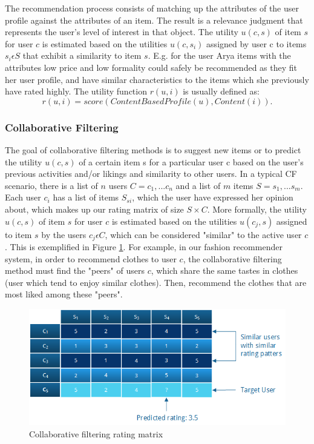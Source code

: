 The recommendation process consists of matching up the attributes of the user profile against the attributes of an item. The result is a relevance judgment that represents the user's level of interest in that object. The utility $u(c, s)$ of item $s$ for user $c$ is estimated based on the utilities $u(c, s_{i})$ assigned by user c to items $s_{i} \epsilon S$ that exhibit a similarity to item $s$. E.g. for the user Arya items with the attributes low price and low formality could safely be recommended as they fit her user profile, and have similar characteristics to the items which she previously have rated highly. The utility function $r(u, i)$ is usually defined as:
\begin{equation}
r(u,i) = score(ContentBasedProfile(u), Content(i)).
\end{equation}

\subsubsection{Collaborative Filtering}
\label{subsec:cf}

The goal of collaborative filtering methods is to suggest new items or to predict the utility $u(c, s)$ of a certain item s for a particular user c based on the user's previous activities and/or likings and similarity to other users. In a typical CF scenario, there is a list of $n$ users $C = {c_{1}, ... c_{n}}$ and a list of $m$ items $S = {s_{1},...s_{m}}$. Each user $c_{i}$ has a list of items $S_{si}$, which the user have expressed her opinion about, which makes up our rating matrix of size $S \times C$. More formally, the utility $u(c, s)$ of item $s$ for user $c$ is estimated based on the utilities $u(c_{j}, s)$ assigned to item $s$ by the users $c_{j} \epsilon C$, which can be considered "similar" to the active user $c$. This is exemplified in Figure \ref{figure:ratingmatrix}. For example, in our fashion recommender system, in order to recommend clothes to user $c$, the collaborative filtering method must find the "peers" of users $c$, which share the same tastes in clothes (user which tend to enjoy similar clothes). Then, recommend the clothes that are most liked among these "peers".

\begin{figure}[H]
    \includegraphics[width=5in]{image/ratingmatrix.png}
    \centering
    \caption[Collaborative filtering rating matrix]{Collaborative filtering rating matrix}
    \label{figure:ratingmatrix}
\end{figure}

